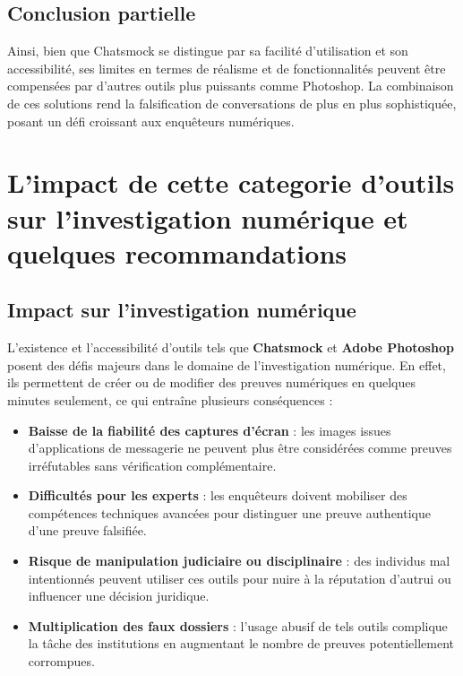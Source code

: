 \documentclass[12pt, a4paper]{article}
\begin{document}
\subsection{Conclusion partielle}
Ainsi, bien que Chatsmock se distingue par sa facilité d’utilisation et son accessibilité, ses limites en termes de réalisme et de fonctionnalités peuvent être compensées par d’autres outils plus puissants comme Photoshop. La combinaison de ces solutions rend la falsification de conversations de plus en plus sophistiquée, posant un défi croissant aux enquêteurs numériques.  


\section{L'impact de cette categorie d'outils sur l'investigation numérique et quelques recommandations}

\subsection{Impact sur l'investigation numérique}
L’existence et l’accessibilité d’outils tels que \textbf{Chatsmock} et \textbf{Adobe Photoshop} posent des défis majeurs dans le domaine de l’investigation numérique. En effet, ils permettent de créer ou de modifier des preuves numériques en quelques minutes seulement, ce qui entraîne plusieurs conséquences :  
\begin{itemize}
	\item \textbf{Baisse de la fiabilité des captures d’écran} : les images issues d’applications de messagerie ne peuvent plus être considérées comme preuves irréfutables sans vérification complémentaire.  
	\item \textbf{Difficultés pour les experts} : les enquêteurs doivent mobiliser des compétences techniques avancées pour distinguer une preuve authentique d’une preuve falsifiée.  
	\item \textbf{Risque de manipulation judiciaire ou disciplinaire} : des individus mal intentionnés peuvent utiliser ces outils pour nuire à la réputation d’autrui ou influencer une décision juridique.  
	\item \textbf{Multiplication des faux dossiers} : l’usage abusif de tels outils complique la tâche des institutions en augmentant le nombre de preuves potentiellement corrompues.  
\end{itemize}
\end{document}
